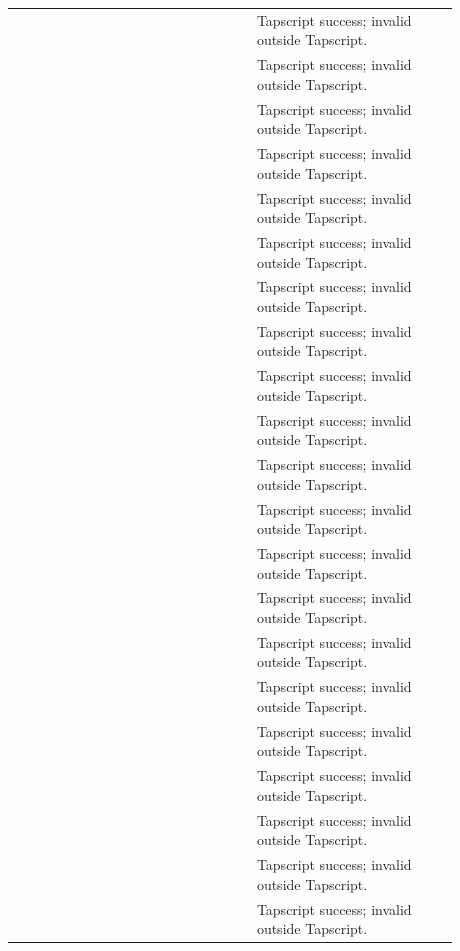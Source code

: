 \begin{longtable}{@{}L{0.14\linewidth}L{0.34\linewidth}L{0.40\linewidth}@{}}
 &  & Tapscript success; invalid outside Tapscript. \\
 &  & Tapscript success; invalid outside Tapscript. \\
 &  & Tapscript success; invalid outside Tapscript. \\
 &  & Tapscript success; invalid outside Tapscript. \\
 &  & Tapscript success; invalid outside Tapscript. \\
 &  & Tapscript success; invalid outside Tapscript. \\
 &  & Tapscript success; invalid outside Tapscript. \\
 &  & Tapscript success; invalid outside Tapscript. \\
 &  & Tapscript success; invalid outside Tapscript. \\
 &  & Tapscript success; invalid outside Tapscript. \\
 &  & Tapscript success; invalid outside Tapscript. \\
 &  & Tapscript success; invalid outside Tapscript. \\
 &  & Tapscript success; invalid outside Tapscript. \\
 &  & Tapscript success; invalid outside Tapscript. \\
 &  & Tapscript success; invalid outside Tapscript. \\
 &  & Tapscript success; invalid outside Tapscript. \\
 &  & Tapscript success; invalid outside Tapscript. \\
 &  & Tapscript success; invalid outside Tapscript. \\
 &  & Tapscript success; invalid outside Tapscript. \\
 &  & Tapscript success; invalid outside Tapscript. \\
 &  & Tapscript success; invalid outside Tapscript. \\

\end{longtable}
